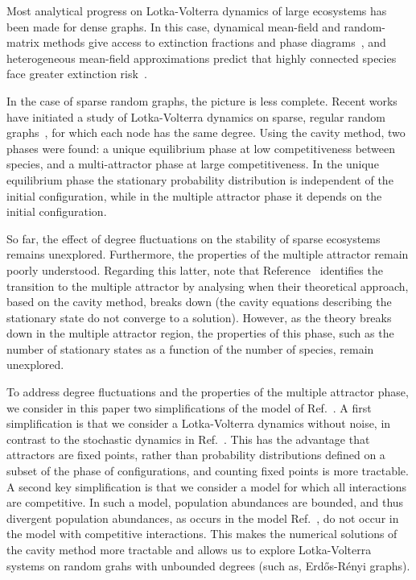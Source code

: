 \documentclass[11pt,a4paper]{article}
\begin{document}
Most analytical progress on Lotka-Volterra  dynamics  of large ecosystems has been made  for dense graphs.  In this case,  dynamical mean-field and random-matrix methods give access to extinction fractions and phase diagrams~\cite{bunin2017,biroli2018}, and  heterogeneous mean-field approximations predict that highly connected species face greater extinction risk~\cite{poley2025}. 

In the case of sparse random graphs,   the picture is less complete.  Recent works have initiated a study of  Lotka-Volterra dynamics on sparse, regular random graphs~\cite{stav2022,tonolo2025generalized}, for which each node has the same degree.    Using the cavity method,  two phases were found: a unique equilibrium  phase  at low competitiveness between species,    and a multi-attractor phase at large competitiveness.  In the unique equilibrium phase 
the stationary probability distribution  is independent of the initial configuration, while in the multiple attractor phase it depends on the initial configuration. 


So far, the effect of degree fluctuations on the stability of sparse ecosystems   remains unexplored.   Furthermore, the  properties of the multiple attractor remain  poorly understood.   Regarding this latter, note that   Reference~\cite{tonolo2025generalized}   identifies the transition  to the multiple attractor  by analysing when their theoretical approach, based on the cavity method, breaks down (the cavity equations describing the stationary state do not converge to a solution).     However, as the theory breaks down in the multiple attractor region, the properties of this phase, such as the number of stationary states as a function of the number of species,  remain unexplored. 


To address degree fluctuations and the properties of the multiple attractor phase,    we consider in this paper  two  simplifications of the model of Ref.~\cite{tonolo2025generalized}.  A first simplification is that we consider a Lotka-Volterra dynamics without noise, in contrast to the stochastic dynamics in  Ref.~\cite{stav2022,tonolo2025generalized}.  This has the advantage that attractors are fixed points, rather than probability distributions defined on a subset of the phase of configurations, and counting fixed points is more tractable.  A second key simplification is that we consider a model for which all interactions are competitive.   In such a model, population abundances are  bounded, and thus divergent population abundances,  as occurs in the  model  Ref.~\cite{tonolo2025generalized}, do not occur in the model with competitive interactions.  This makes the numerical solutions of the cavity method more tractable and allows us to explore Lotka-Volterra systems on random grahs with unbounded degrees (such as, Erd\H{o}s-R\'{e}nyi graphs).  
    
\end{document}
